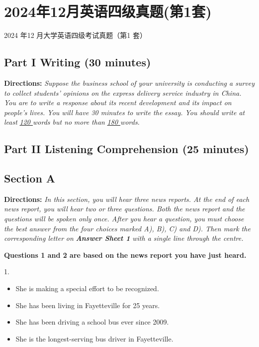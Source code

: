 \documentclass[UTF8,11pt]{ctexart}
\begin{document}
\section*{2024年12月英语四级真题(第1套)}
2024 年12 月大学英语四级考试真题（第1 套）


\subsection*{\textbf{Part I Writing} \textbf{(30 minutes)}}


\textbf{Directions:} \textit{Suppose the business school of your university is conducting a survey to collect students’ opinions on} \textit{the express delivery service industry in China. You are to write a response about its recent development and its} \textit{impact on people’s lives. You will have 30 minutes to write the essay. You should write at least }\textit{\uline{120 }}\textit{words but no} \textit{more than }\textit{\uline{180 }}\textit{words.}


\subsection*{\textbf{Part II} \textbf{Listening Comprehension} \textbf{(25 minutes)}}


\subsection*{\textbf{Section A}}


\textbf{Directions:} \textit{In this section, you will hear three news reports. At the end of each news report, you will hear two or} \textit{three questions. Both the news report and the questions will be spoken only once. After you hear a question, you} \textit{must choose the best answer from the four choices marked A), B), C) and D). Then mark the corresponding letter} \textit{on }\textbf{\textit{Answer Sheet 1}}\textit{ with a single line through the centre.}


\textbf{Questions 1 and 2 are based on the news report you have just heard.}


1.


\begin{itemize}[leftmargin=2em,itemsep=.2em,topsep=.4em]\item[A.] She is making a special effort to be recognized.
\item[B.] She has been living in Fayetteville for 25 years.
\item[C.] She has been driving a school bus ever since 2009.
\item[D.] She is the longest-serving bus driver in Fayetteville.
\end{itemize}
\end{document}
